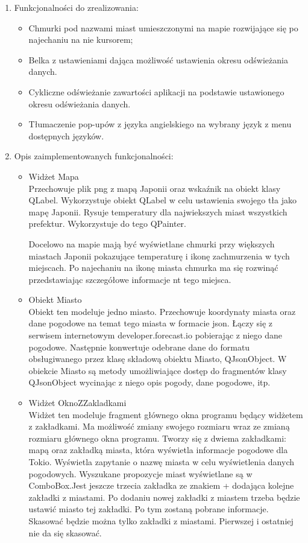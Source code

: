 \documentclass[a4paper]{article}
\begin{document}
\begin{enumerate}
\item Funkcjonalności do zrealizowania:
\begin{itemize}
\item Chmurki pod nazwami miast umieszczonymi na mapie rozwijające się po najechaniu na nie kursorem;
\item Belka z ustawieniami dająca możliwość ustawienia okresu odświeżania danych.
\item Cykliczne odświeżanie zawartości aplikacji na podstawie ustawionego okresu odświeżania danych.
\item Tłumaczenie pop-upów z języka angielskiego na wybrany język z menu dostępnych języków.
\end{itemize}

\item Opis zaimplementowanych funkcjonalności:
\begin{itemize}

\item Widżet Mapa\\
Przechowuje plik png z mapą Japonii oraz wskaźnik na obiekt klasy QLabel. Wykorzystuje obiekt QLabel w celu ustawienia swojego tła jako mapę Japonii. Rysuje temperatury dla najwiekszych miast wszystkich prefektur. Wykorzystuje do tego QPainter.

Docelowo na mapie mają być wyświetlane chmurki przy większych miastach Japonii pokazujące temperaturę i ikonę zachmurzenia w tych miejscach. Po najechaniu na ikonę miasta chmurka ma się rozwinąć przedstawiając szczegółowe informacje nt tego miejsca.

\item Obiekt Miasto\\
Obiekt ten modeluje jedno miasto. Przechowuje koordynaty miasta oraz dane pogodowe na temat tego miasta w formacie json. Łączy się z serwisem internetowym developer.forecast.io pobierając z niego dane pogodowe. Następnie konwertuje odebrane dane do formatu obsługiwanego przez klasę składową obiektu Miasto, QJsonObject.
W obiekcie Miasto są metody umożliwiające dostęp do fragmentów klasy QJsonObject wycinając z niego opis pogody, dane pogodowe, itp.

\item Widżet OknoZZakladkami\\
Widżet ten modeluje fragment głównego okna programu będący widżetem z zakładkami. Ma możliwość zmiany swojego rozmiaru wraz ze zmianą rozmiaru głównego okna programu. Tworzy się z dwiema zakładkami: mapą oraz zakładką miasta, która wyświetla informacje pogodowe dla Tokio. Wyświetla zapytanie o nazwę miasta w celu wyświetlenia danych pogodowych. Wyszukane propozycje miast wyświetlane są w ComboBox.Jest jeszcze trzecia zakładka ze znakiem + dodająca kolejne zakładki z miastami. Po dodaniu nowej zakładki z miastem trzeba będzie ustawić miasto tej zakładki. Po tym zostaną pobrane informacje. Skasować będzie można tylko zakładki z miastami. Pierwszej i ostatniej nie da się skasować.


\end{itemize}
\end{enumerate}
\end{document}
